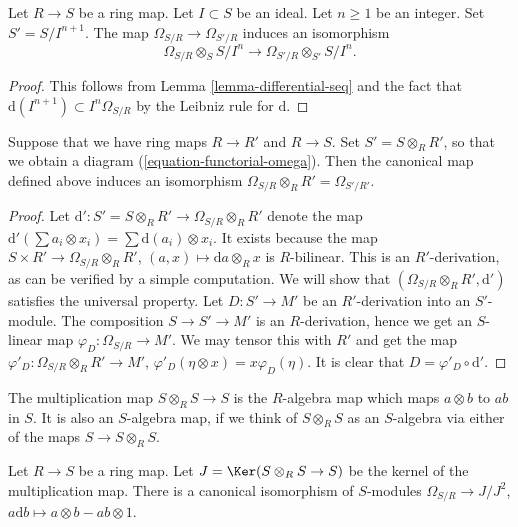 \begin{lemma}
\label{lemma-differential-mod-power-ideal}
Let $R \to S$ be a ring map. Let $I \subset S$ be an ideal.
Let $n \geq 1$ be an integer. Set $S' = S/I^{n + 1}$.
The map $\Omega_{S/R} \to \Omega_{S'/R}$ induces an
isomorphism
$$
\Omega_{S/R} \otimes_S S/I^n
\longrightarrow
\Omega_{S'/R} \otimes_{S'} S/I^n.
$$
\end{lemma}

\begin{proof}
This follows from Lemma \ref{lemma-differential-seq} and the fact that
$\text{d}(I^{n + 1}) \subset I^n\Omega_{S/R}$ by the
Leibniz rule for $\text{d}$.
\end{proof}

\begin{lemma}
\label{lemma-differentials-base-change}
Suppose that we have ring maps $R \to R'$ and $R \to S$.
Set $S' = S \otimes_R R'$, so that we obtain a diagram
(\ref{equation-functorial-omega}). Then the canonical map defined above
induces an isomorphism $\Omega_{S/R} \otimes_R R' = \Omega_{S'/R'}$.
\end{lemma}

\begin{proof}
Let $\text{d}' : S' = S \otimes_R R' \to \Omega_{S/R} \otimes_R R'$ denote the
map $\text{d}'( \sum a_i \otimes x_i ) = \sum \text{d}(a_i) \otimes x_i$.
It exists because the map $S \times R' \to \Omega_{S/R} \otimes_R R'$,
$(a, x)\mapsto \text{d}a \otimes_R x$ is $R$-bilinear.
This is an $R'$-derivation, as can be verified by a simple computation.
We will show that $(\Omega_{S/R} \otimes_R R', \text{d}')$ satisfies
the universal property. Let $D : S' \to M'$ be an $R'$-derivation
into an $S'$-module. The composition $S \to S' \to M'$ is an $R$-derivation,
hence we get an $S$-linear map $\varphi_D : \Omega_{S/R} \to M'$. We may
tensor this with $R'$ and get the map $\varphi'_D :
\Omega_{S/R} \otimes_R R' \to M'$, $\varphi'_D(\eta \otimes x) =
x\varphi_D(\eta)$. It is clear that $D = \varphi'_D \circ \text{d}'$.
\end{proof}

\noindent
The multiplication map $S \otimes_R S \to S$ is the $R$-algebra
map which maps $a \otimes b$ to $ab$ in $S$. It is also an
$S$-algebra map, if we think of $S \otimes_R S$ as an $S$-algebra
via either of the maps $S \to S \otimes_R S$.

\begin{lemma}
\label{lemma-differentials-diagonal}
Let $R \to S$ be a ring map. Let $J = \Ker(S \otimes_R S \to S)$
be the kernel of the multiplication map. There is a canonical
isomorphism of $S$-modules $\Omega_{S/R} \to J/J^2$,
$a \text{d} b \mapsto a \otimes b - ab \otimes 1$.
\end{lemma}

